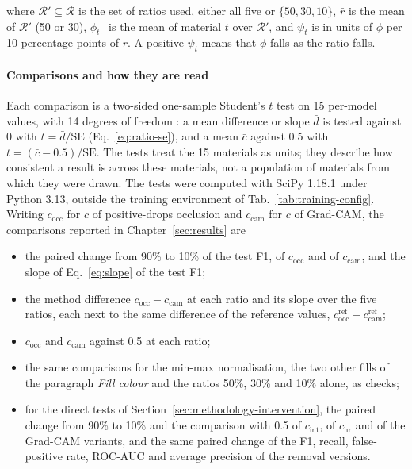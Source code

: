 where $\mathcal{R}' \subseteq \mathcal{R}$ is the set of ratios used, either all five
or $\{50, 30, 10\}$, $\bar{r}$ is the mean of $\mathcal{R}'$ (50 or 30),
$\bar{\phi}_{t \cdot}$ is the mean of material $t$ over $\mathcal{R}'$, and $\psi_t$ is
in units of $\phi$ per 10 percentage points of $r$. A positive $\psi_t$ means that
$\phi$ falls as the ratio falls.

\paragraph{Comparisons and how they are read}
\label{sec:methodology-tests}
Each comparison is a two-sided one-sample Student's $t$ test on 15 per-model values,
with 14 degrees of freedom \citep{student1908probable, virtanen2020scipy}: a mean difference
or slope $\bar{d}$ is tested against 0 with $t = \bar{d}/\mathrm{SE}$
(Eq.~\eqref{eq:ratio-se}), and a mean $\bar{c}$ against 0.5 with
$t = (\bar{c} - 0.5)/\mathrm{SE}$. The tests treat the 15 materials as units; they
describe how consistent a result is across these materials, not a population of
materials from which they were drawn. The tests were computed with SciPy 1.18.1
under Python 3.13, outside the training environment of Tab.~\ref{tab:training-config}.
Writing $c_{\mathrm{occ}}$ for $c$ of
positive-drops occlusion and $c_{\mathrm{cam}}$ for $c$ of Grad-CAM, the comparisons
reported in Chapter~\ref{sec:results} are
\begin{itemize}
\item the paired change from 90\% to 10\% of the test F1, of $c_{\mathrm{occ}}$ and of
  $c_{\mathrm{cam}}$, and the slope of Eq.~\eqref{eq:slope} of the test F1;
\item the method difference $c_{\mathrm{occ}} - c_{\mathrm{cam}}$ at each ratio and its
  slope over the five ratios, each next to the same difference of the reference values,
  $c^{\mathrm{ref}}_{\mathrm{occ}} - c^{\mathrm{ref}}_{\mathrm{cam}}$;
\item $c_{\mathrm{occ}}$ and $c_{\mathrm{cam}}$ against 0.5 at each ratio;
\item the same comparisons for the min-max normalisation, the two other fills of the
  paragraph \emph{Fill colour} and the ratios 50\%, 30\% and 10\% alone, as checks;
\item for the direct tests of Section~\ref{sec:methodology-intervention}, the paired
  change from 90\% to 10\% and the comparison with 0.5 of $c_{\mathrm{int}}$, of
  $c_{\mathrm{hr}}$ and of the Grad-CAM variants, and the same paired change of the
  F1, recall, false-positive rate, ROC-AUC and average precision of the removal
  versions.
\end{itemize}
